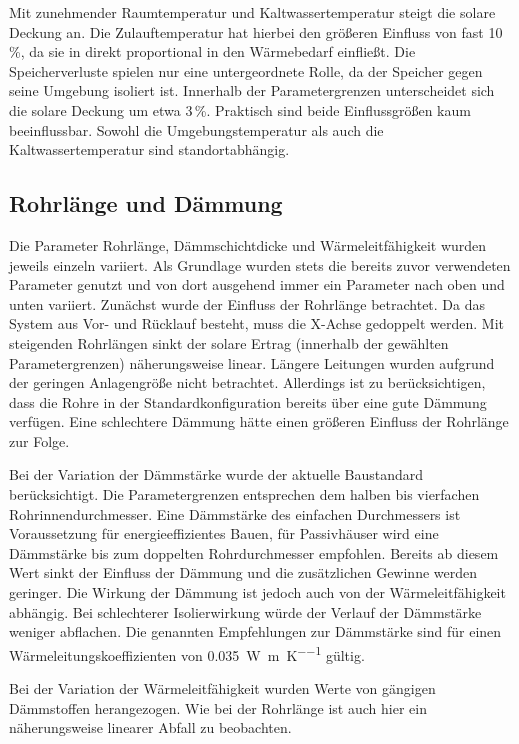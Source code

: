 Mit zunehmender Raumtemperatur und Kaltwassertemperatur steigt die solare Deckung an. Die Zulauftemperatur hat hierbei den größeren Einfluss von fast 10\,\%, da sie in direkt proportional in den Wärmebedarf einfließt. Die Speicherverluste spielen nur eine untergeordnete Rolle, da der Speicher gegen seine Umgebung isoliert ist. Innerhalb der Parametergrenzen unterscheidet sich die solare Deckung um etwa 3\,\%. Praktisch sind beide Einflussgrößen kaum beeinflussbar. Sowohl die Umgebungstemperatur als auch die Kaltwassertemperatur sind standortabhängig.

\subsection{Rohrlänge und Dämmung}
Die Parameter Rohrlänge, Dämmschichtdicke und Wärmeleitfähigkeit wurden jeweils einzeln variiert. Als Grundlage wurden stets die bereits zuvor verwendeten Parameter genutzt und von dort ausgehend immer ein Parameter nach oben und unten variiert.  Zunächst wurde der Einfluss der Rohrlänge betrachtet. Da das System aus Vor- und Rücklauf besteht, muss die X-Achse gedoppelt werden. Mit steigenden Rohrlängen sinkt der solare Ertrag (innerhalb der gewählten Parametergrenzen) näherungsweise linear. Längere Leitungen wurden aufgrund der geringen Anlagengröße nicht betrachtet. Allerdings ist zu berücksichtigen, dass die Rohre in der Standardkonfiguration bereits über eine gute Dämmung verfügen. Eine schlechtere Dämmung hätte einen größeren Einfluss der Rohrlänge zur Folge.

Bei der Variation der Dämmstärke wurde der aktuelle Baustandard berücksichtigt. Die Parametergrenzen entsprechen dem halben bis vierfachen Rohrinnendurchmesser. Eine Dämmstärke des einfachen Durchmessers ist Voraussetzung für energieeffizientes Bauen, für Passivhäuser wird eine Dämmstärke bis zum doppelten Rohrdurchmesser empfohlen. Bereits ab diesem Wert sinkt der Einfluss der Dämmung und die zusätzlichen Gewinne werden geringer. Die Wirkung der Dämmung ist jedoch auch von der Wärmeleitfähigkeit abhängig. Bei schlechterer Isolierwirkung würde der Verlauf der Dämmstärke weniger abflachen. Die genannten Empfehlungen zur Dämmstärke sind für einen Wärmeleitungskoeffizienten von \SI{0,035}{\watt\per\meter\per\kelvin} gültig.

Bei der Variation der Wärmeleitfähigkeit wurden Werte von gängigen Dämmstoffen herangezogen. Wie bei der Rohrlänge ist auch hier ein näherungsweise linearer Abfall zu beobachten.

